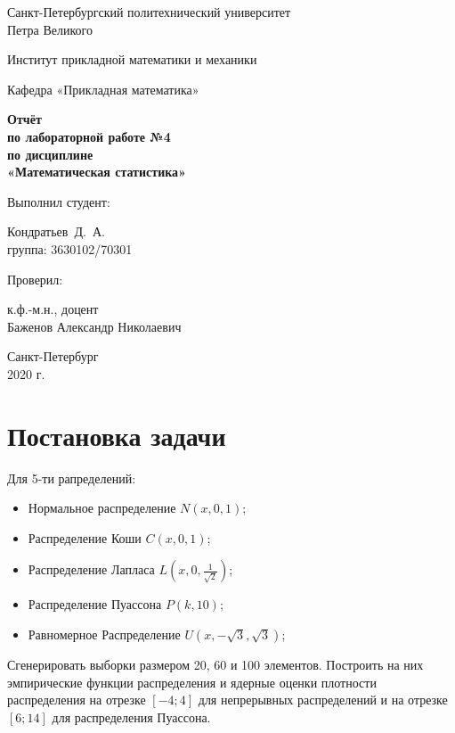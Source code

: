 \documentclass[12pt,a4paper]{article}
\begin{document}
	\begin{titlepage}
		\begin{center}			
			Санкт-Петербургский политехнический университет\\
			Петра Великого
			\vspace{0.25cm}
			
			Институт прикладной математики и механики
			
			Кафедра «Прикладная математика»
			\vfill
			
			\textbf{Отчёт\\
				по лабораторной работе №4\\
				по дисциплине\\
				«Математическая статистика»}\\[5mm]
			\bigskip
		\end{center}
		\vfill
		
		\hfill\begin{minipage}{0.45\textwidth}
			Выполнил студент:
			\vspace{0.2cm}
			
			Кондратьев~Д.~А.\\
			группа: 3630102/70301
		\end{minipage}%
		\bigskip
		
		\hfill\begin{minipage}{0.45\textwidth}
			Проверил:
			\vspace{0.2cm}
			
			к.ф.-м.н., доцент\\
			Баженов Александр Николаевич
		\end{minipage}%
		\vfill
		
		\begin{center}
			Санкт-Петербург\\
			2020 г.
		\end{center}
	\end{titlepage}
	
	
	
	\tableofcontents{}
	\listoffigures
	
	\newpage
	\section{Постановка задачи}
	
	Для 5-ти рапределений:
	\begin{itemize}
		\item Нормальное распределение $N(x,0,1)$;
		\item Распределение Коши $C(x,0,1)$;
		\item Распределение Лапласа $L( x,0,\frac{1}{\sqrt{2}})$;
		\item Распределение Пуассона $P(k, 10)$;
		\item Равномерное Распределение $U(x,-\sqrt{3}, \sqrt{3})$;
	\end{itemize}
	Сгенерировать выборки размером 20, 60 и 100 элементов. Построить на них эмпирические функции распределения и ядерные оценки плотности распределения на отрезке $[-4;4]$ для непрерывных распределений и на отрезке $[6;14]$ для распределения Пуассона.
	
\end{document}
